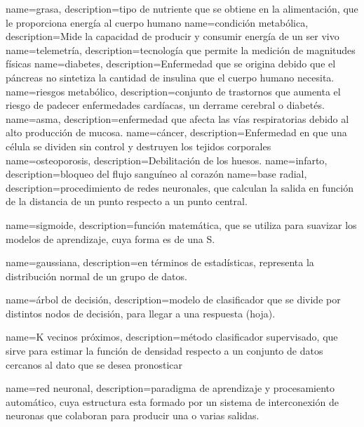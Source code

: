  {
 name={grasa},
 description={tipo de nutriente que se obtiene en la alimentaci\'on, que le proporciona energ\'ia al cuerpo humano}
 }
 {
 name={condici\'on metab\'olica},
 description={Mide la capacidad de producir y consumir energ\'ia de un ser vivo}
 }
 {
 name={telemetr\'ia},
 description={tecnolog\'ia que permite la medici\'on de magnitudes f\'isicas}
 }
 {
 name={diabetes},
 description={Enfermedad que se origina debido que el p\'ancreas no sintetiza la cantidad de insulina que el cuerpo humano necesita.}
 }
 {
 name={riesgos metab\'olico},
 description={conjunto de trastornos que aumenta el riesgo de padecer enfermedades card\'iacas, un derrame cerebral o diabet\'es.}
 }
 {
 name={asma},
 description={enfermedad que afecta las v\'ias respiratorias debido al alto producci\'on de mucosa.}
 }
 {
 name={c\'ancer},
 description={Enfermedad en que una c\'elula se dividen sin control y destruyen los tejidos corporales}
 }
 {
 name={osteoporosis},
 description={Debilitaci\'on de los huesos. }
 }
 {
 name={infarto},
 description={bloqueo del flujo sangu\'ineo al coraz\'on}
 }
 {
 name={base radial},
 description={procedimiento de redes neuronales, que calculan la salida en funci\'on de la distancia de un punto respecto a un punto central. }
 }
 
 {
 name={sigmoide},
 description={funci\'on matem\'atica, que se utiliza para suavizar los modelos de aprendizaje, cuya forma es de una S. }
 }
 
 {
 name={gaussiana},
 description={en t\'erminos de estad\'isticas, representa la distribuci\'on normal de un grupo de datos.}
 }
 
 {
 name={\'arbol de decisi\'on},
 description={modelo de clasificador que se divide por distintos nodos de decisi\'on, para llegar a una respuesta (hoja).}
 }
 
 {
 name={K vecinos pr\'oximos},
 description={m\'etodo clasificador supervisado, que sirve para estimar la funci\'on de densidad respecto a un conjunto de datos cercanos al dato que se desea pronosticar}
 } 
 
 {
 name={red neuronal},
 description={paradigma de aprendizaje y procesamiento autom\'atico, cuya estructura esta formado por un sistema de interconexi\'on de neuronas que colaboran para producir una o varias salidas.}
 }
 
